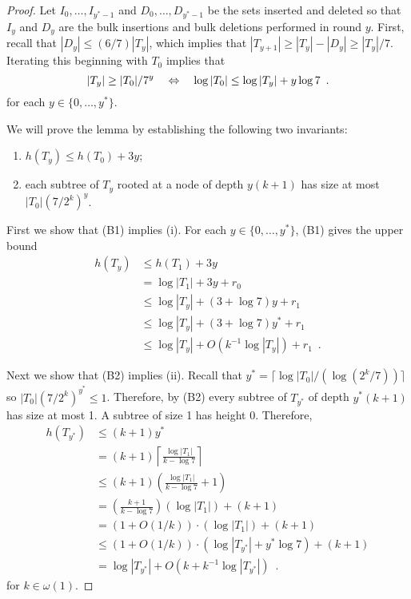 \documentclass[kpfonts]{patmorin}
\newcommand{\snote}[1]{\fcolorbox{red}{yellow}{#1}}
\begin{document}
\begin{proof}
  Let $I_0,\ldots,I_{y^*-1}$ and $D_0,\ldots,D_{y^*-1}$ be the sets inserted and deleted so that $I_y$ and $D_y$ are the bulk insertions and bulk deletions performed in round $y$.  First, recall that $|D_y|\le (6/7)|T_y|$, which implies that $|T_{y+1}|\ge |T_y|-|D_y|\ge |T_y|/7$.  Iterating this beginning with $T_0$ implies that 
  \begin{equation}
    |T_y|\ge |T_0|/7^y \quad \Leftrightarrow \quad \log|T_0| \le \log|T_y| + y\log 7 \enspace . \eqlabel{height-diff}
  \end{equation}
  for each $y\in\{0,\ldots,y^*\}$. 


  We will prove the lemma by establishing the following two invariants:
  \begin{enumerate}[(B1)]
    \item $h(T_y)\le h(T_0) + 3y$;
    \item each subtree of $T_y$ rooted at a node of depth $y(k+1)$ has size at most $|T_0|(7/2^k)^{y}$.
  \end{enumerate}

  First we show that (B1) implies (i). For each  $y\in\{0,\ldots,y^*\}$, (B1) gives the upper bound
  \begin{align}
       h(T_y) & \le h(T_1) + 3y \nonumber \\
              &= \log|T_1| + 3y + r_0 \nonumber \\
              &\le \log |T_y| + (3+\log 7)y + r_1 \nonumber \\
              &\le \log |T_y| + (3+\log 7)y^* + r_1 \nonumber \\
              &\le \log |T_y| + O(k^{-1}\log|T_y|) + r_1 \enspace .
  \end{align}

  Next we show that (B2) implies (ii).  Recall that $y^*=\lceil\log|T_0|/(\log(2^k/7))\rceil$ so
  $|T_{0}|(7/2^k)^{y^*} \le 1$.  Therefore, by (B2) every subtree of $T_{y^*}$ of depth $y^*(k+1)$ has size at most 1.  A subtree of size 1 has height 0.  Therefore,
  \begin{align*}
    h(T_{y^*}) & \le (k+1)y^* \\
    & = (k+1)\left\lceil \frac{\log|T_1|}{k-\log 7}\right\rceil \\
    & \le (k+1)\left(\frac{\log|T_1|}{k-\log 7 } + 1\right)\\
    & = \left(\frac{k+1}{k-\log 7}\right)\left(\log|T_1|\right) + (k+1)\\
    & = (1+O(1/k))\cdot(\log|T_1|) + (k+1) \\
    & \le (1+O(1/k))\cdot(\log|T_{y^*}| + y^*\log 7) + (k+1) \\
    & = \log|T_{y^*}| + O(k+k^{-1}\log |T_{y^*}|) \enspace .
  \end{align*}
  for $k\in\omega(1)$.  



\end{proof}
\end{document}
